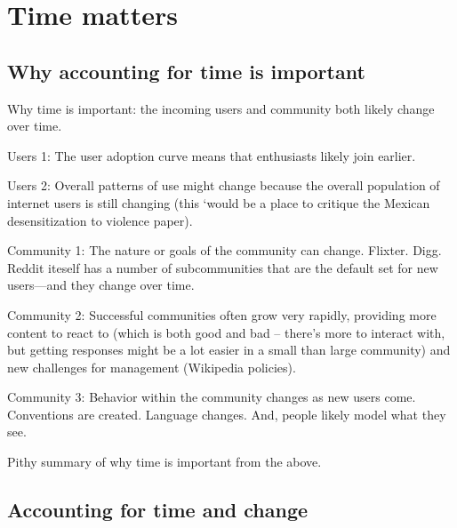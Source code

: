 \section{Time matters}  %


\subsection{Why accounting for time is important}

Why time is important: the incoming users and community both likely change over time.  

Users 1: The user adoption curve means that enthusiasts likely join earlier.  

Users 2: Overall patterns of use might change because the overall population of internet users is still changing (this `would be a place to critique the Mexican desensitization to violence paper).

Community 1: The nature or goals of the community can change.  Flixter.  Digg.  Reddit iteself has a number of subcommunities that are the default set for new users---and they change over time. 

Community 2: Successful communities often grow very rapidly, providing more content to react to (which is both good and bad -- there's more to interact with, but getting responses might be a lot easier in a small than large community) and new challenges for management (Wikipedia policies).  

Community 3: Behavior within the community changes as new users come.  Conventions are created.  Language changes.  And, people likely model what they see. 

Pithy summary of why time is important from the above.

\subsection{Accounting for time and change}

